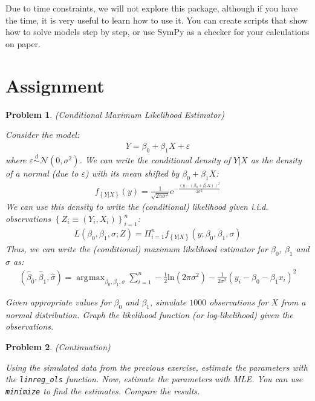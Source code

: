\documentclass[12pt, a4paper]{article}
\newcommand{\e}[1]{\text{e}^{#1}}
\newcommand{\Normal}[1]{\mathcal{N}\left(0, #1\right)}
\newcommand{\Set}[1]{\left\{#1\right\}}
\renewcommand{\ln}[1]{\text{ln}\left(#1\right)}
\DeclareMathOperator*{\argmax}{\arg\!\max}
\newtheorem{problem}{Problem}
\begin{document}
Due to time constraints, we will not explore this package, although if you have the time, it is very useful to learn how to use it.
You can create scripts that show how to solve models step by step, or use SymPy as a checker for your calculations on paper.
\section{Assignment}
\label{sec:orgb8fb3f3}
\begin{problem}
(Conditional Maximum Likelihood Estimator)

Consider the model:
\begin{align*}
Y = \beta_0 + \beta_1X + \varepsilon
\end{align*}
where \(\varepsilon\overset{d}{\sim}\Normal{\sigma^2}\).
We can write the conditional density of \(Y\vert X\) as the density of a normal (due to \(\varepsilon\)) with its mean shifted by \(\beta_0+\beta_1X\):
\begin{align*}
f_{\Set{Y\vert X}}(y)=\frac{1}{\sqrt{2\pi\sigma^2}}\e{-\frac{(y-(\beta_0+\beta_1X))^2}{2\sigma^2}}
\end{align*}
We can use this density to write the (conditional) likelihood given i.i.d. observations \(\Set{Z_i\equiv(Y_i, X_i)}_{i=1}^n\):
\begin{align*}
L(\beta_0,\beta_1,\sigma; Z) = \Pi_{i=1}^n f_{\Set{Y\vert X}}(y; \beta_0,\beta_1,\sigma)
\end{align*}
Thus, we can write the (conditional) maximum likelihood estimator for \(\beta_0\), \(\beta_1\) and \(\sigma\) as:
\begin{align*}
(\hat{\beta}_0, \hat{\beta}_1, \hat{\sigma}) = \argmax_{\beta_0, \beta_1, \sigma}{\sum_{i=1}^n-\frac{1}{2}\ln{2\pi\sigma^2}-\frac{1}{2\sigma^2}(y_i-\beta_0-\beta_1x_i)^2}
\end{align*}

Given appropriate values for \(\beta_0\) and \(\beta_1\), simulate \(1000\) observations for \(X\) from a normal distribution.
Graph the likelihood function (or log-likelihood) given the observations.
\end{problem}

\begin{problem}
(Continuation)

Using the simulated data from the previous exercise, estimate the parameters with the \texttt{linreg\_ols} function.
Now, estimate the parameters with MLE.
You can use \texttt{minimize} to find the estimates.
Compare the results.
\end{problem}
\end{document}
